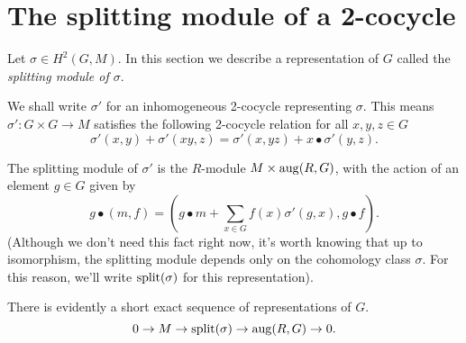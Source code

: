 





\section{The splitting module of a 2-cocycle}

Let $\sigma \in H^2(G,M)$.
In this section we describe a representation of $G$ called the \emph{splitting module of $\sigma$}.

We shall write $\sigma'$ for an inhomogeneous 2-cocycle representing $\sigma$.
This means $\sigma' : G \times G \to M$ satisfies the following 2-cocycle
relation for all $x,y,z\in G$
\begin{equation}
	\label{def:2-cocycle relation}
	\sigma'(x,y) + \sigma'(xy,z) = \sigma'(x,yz) + x \bullet \sigma'(y,z).
\end{equation}


\begin{definition} \label{def:splitting module}
	The splitting module of $\sigma'$ is the $R$-module $M \times \mathrm{aug}(R,G)$,
	with the action of an element $g \in G$ given by
	\[
		g \bullet (m,f)
		= \left(g \bullet m + \sum_{x \in G} f(x) \sigma'(g,x) , g \bullet f\right).
	\]
	(Although we don't need this fact right now, it's worth knowing that up to isomorphism,
	the splitting module depends only on the cohomology class $\sigma$. For this reason, we'll write
	$\mathrm{split}(\sigma)$ for this representation).
\end{definition}



There is evidently a short exact sequence of representations of $G$.
\begin{equation}
	\label{eq:split ses}
	0 \to M \to \mathrm{split}(\sigma) \to \mathrm{aug}(R,G) \to 0.
\end{equation}

